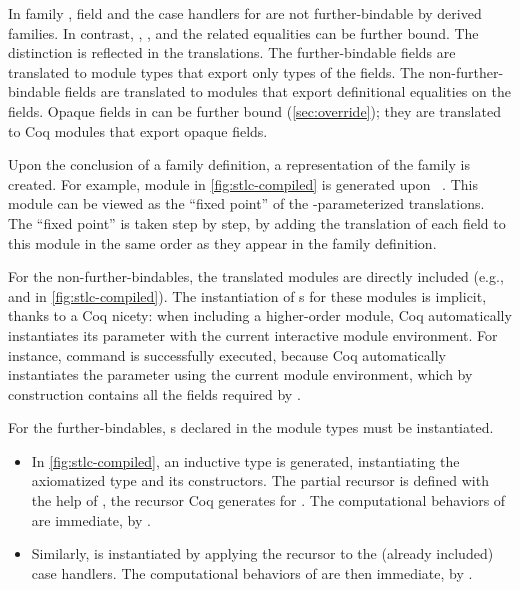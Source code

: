 In family ,
field  and the case handlers for 
are not further-bindable by derived families.
In contrast, , , and the related equalities
can be further bound.
The distinction is reflected in the translations.
The further-bindable fields are translated to module types that export only types of the fields.
The non-further-bindable fields are translated to modules that export definitional equalities
on the fields.
Opaque fields in \Lang can be further bound (\cref{sec:override});
they are translated to Coq modules that export opaque fields.




Upon the conclusion of a family definition,
a representation of the family is created.
For example, module  in \cref{fig:stlc-compiled} is generated
upon ~.
%
This module can be viewed as the ``fixed point'' of the
-parameterized translations.
The ``fixed point'' is taken step by step, by adding the translation of
each field to this module in the same order as they appear in the family
definition.

For the non-further-bindables, the translated modules are directly included
(e.g.,  and  in \cref{fig:stlc-compiled}).
%
The instantiation of s for these modules is implicit, thanks to a Coq nicety:
when including a higher-order module, Coq automatically instantiates its
parameter with the current interactive module environment.
For instance, command  is successfully executed,
because Coq automatically instantiates the  parameter using the current
module environment, which by construction contains all the fields required by .

For the further-bindables, s declared in the module types must be instantiated.
%
\begin{itemize}
  [align=left,itemsep=2pt,labelsep=*,leftmargin=*]

\item
In \cref{fig:stlc-compiled},
an inductive type  is generated, instantiating the axiomatized
 type and its constructors.
%
The partial recursor  is defined
with the help of , the recursor Coq generates for .
The computational behaviors of  are immediate, by .

\item
Similarly,  is instantiated by applying the recursor 
to the (already included) case handlers. %
The computational behaviors of  are then immediate, by .

\end{itemize}

